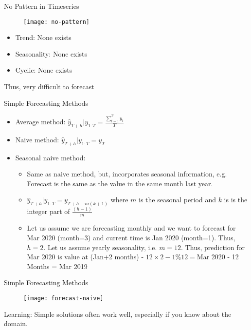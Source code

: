 \documentclass{beamer}
\begin{document}
\begin{frame}{No Pattern in Timeseries}
\begin{figure}
	\centering
	\texttt{[image: no-pattern]}
	
	\vspace{-15pt}
	\label{fig:forecast}
\end{figure}

\begin{itemize}
	\item Trend: None exists
	\item Seasonality: None exists
	\item Cyclic: None exists
\end{itemize}
Thus, very difficult to forecast
\end{frame}

\begin{frame}{Simple Forecasting Methods}
\begin{itemize}
	\item Average method: $\hat{y}_{T+h}|y_{1:T} = \frac{\sum_{t =1}^{T}y_t}{T}$
	\item Naive method: $\hat{y}_{T+h}|y_{1:T} = y_T$
	\item Seasonal naive method: 
	\begin{itemize}
		\item Same as naive method, but, incorporates seasonal information, e.g. Forecast is the same as the value in the same month last year.
		\item $\hat{y}_{T+h}|{y_{1:T}} = y_{T+h-m(k+1)}$
		where $m$ is the seasonal period and $k$ is is the integer part of $\frac{(h-1)}{m}$ 
		\item Let us assume we are forecasting monthly and we want to forecast for Mar 2020 (month=3) and current time is Jan 2020 (month=1). Thus, $h=2$. Let us assume yearly seasonality, i.e. $m=12$. Thus, prediction for Mar 2020 is value at (Jan+2 months) - $12\times {2-1}\%{12} = $Mar 2020 - 12 Months = Mar 2019
	\end{itemize} 
	
\end{itemize}


\end{frame}

\begin{frame}{Simple Forecasting Methods}
\begin{figure}
	\centering
	\texttt{[image: forecast-naive]}
	
	\vspace{-15pt}
	\label{fig:forecast}
\end{figure}

Learning: Simple solutions often work well, especially if you know about the domain.
\end{frame}
\end{document}
